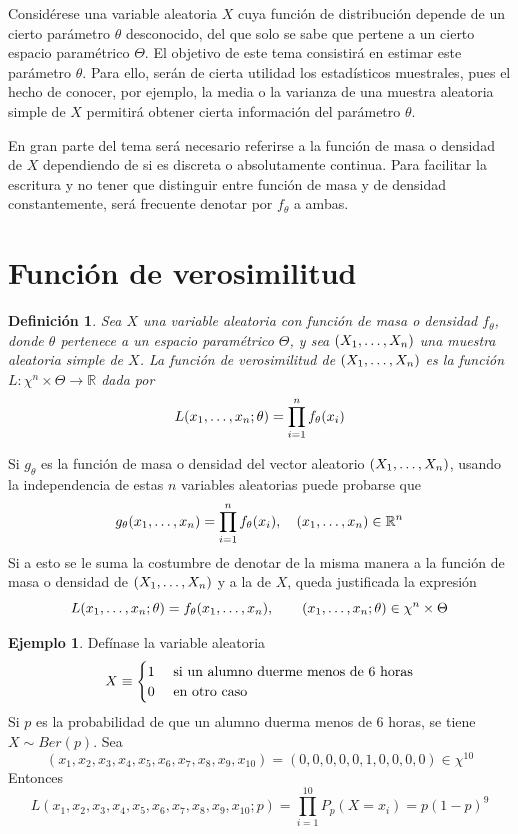 \documentclass[11pt]{report}
\newtheorem{definition}{Definición}
\theoremstyle{definition}
\newtheorem{example}{Ejemplo}
\newcommand{\R}{\mathbb R}
\begin{document}
Considérese una variable aleatoria $X$ cuya función de distribución depende de un cierto parámetro $\theta$ desconocido, del que solo se sabe que pertene a un cierto espacio paramétrico $\Theta$. El objetivo de este tema consistirá en estimar este parámetro $\theta$. Para ello, serán de cierta utilidad los estadísticos muestrales, pues el hecho de conocer, por ejemplo, la media o la varianza de una muestra aleatoria simple de $X$ permitirá obtener cierta información del parámetro $\theta$.

En gran parte del tema será necesario referirse a la función de masa o densidad de $X$ dependiendo de si es discreta o absolutamente continua. Para facilitar la escritura y no tener que distinguir entre función de masa y de densidad constantemente, será frecuente denotar por $f_\theta$ a ambas.

\section{Función de verosimilitud}

\begin{definition}
Sea $X$ una variable aleatoria con función de masa o densidad $f_\theta$, donde $\theta$ pertenece a un espacio paramétrico $\Theta$, y sea $(X_1,\mathellipsis,X_n)$ una muestra aleatoria simple de $X$. La \emph{función de verosimilitud de $(X_1,\mathellipsis,X_n)$} es la función $L \colon \chi^n \times \Theta \to \R$ dada por
\[L(x_1,\mathellipsis,x_n;\theta)=\prod_{i=1}^n f_\theta(x_i)\]
\end{definition}

Si $g_\theta$ es la función de masa o densidad del vector aleatorio $(X_1,\mathellipsis,X_n)$, usando la independencia de estas $n$ variables aleatorias puede probarse que
\[g_\theta(x_1,\mathellipsis,x_n) = \prod_{i=1}^nf_\theta(x_i), \quad (x_1,\mathellipsis,x_n) \in \R^n\]
Si a esto se le suma la costumbre de denotar de la misma manera a la función de masa o densidad de $(X_1,\mathellipsis,X_n)$ y a la de $X$, queda justificada la expresión
\[L(x_1,\mathellipsis,x_n;\theta) = f_\theta(x_1,\mathellipsis,x_n), \qquad (x_1,\mathellipsis,x_n;\theta) \in \chi^n \times \Theta\]

\begin{example}
Defínase la variable aleatoria
\[X \equiv \begin{cases}
    1 & $ si un alumno duerme menos de 6 horas$ \\
    0 & $ en otro caso$
\end{cases}\]
Si $p$ es la probabilidad de que un alumno duerma menos de $6$ horas, se tiene $X \sim Ber(p)$. Sea \[(x_1,x_2,x_3,x_4,x_5,x_6,x_7,x_8,x_9,x_{10}) = (0,0,0,0,0,1,0,0,0,0) \in \chi^{10}\] Entonces
\[L(x_1,x_2,x_3,x_4,x_5,x_6,x_7,x_8,x_9,x_{10};p) = \prod_{i=1}^{10}P_p(X = x_i) = p(1-p)^9\]
\end{example}
\end{document}
